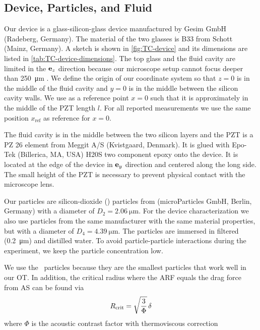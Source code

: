 \subsection{Device, Particles, and Fluid}

Our device is a glass-silicon-glass device manufactured by Gesim GmbH 
(Radeberg, Germany). The material of the two glasses is B33 from Schott (Mainz, 
Germany). A sketch is shown in \cref{fig:TC-device} and its dimensions are listed 
in \cref{tab:TC-device-dimensions}. The top glass and the fluid cavity are limited 
in the $\vb{e}_{z}$ direction because our microscope setup cannot focus deeper than 
\SI{250}{\um} \cite{Lamprecht2016,Lamprecht2017}. We define the origin of our 
coordinate system so that $z = 0$ is in the middle of the fluid cavity and $y = 
0$ is in the middle between the silicon cavity walls. We use as a reference 
point $x = 0$ such that it is approximately in the middle of the PZT length 
$l$. For all reported measurements we use the same position $x_{\text{ref}}$ as 
reference for $x=0$.

The fluid cavity is in the middle between the two silicon layers and the 
PZT is a PZ 26 element from Meggit A/S (Kvistgaard, 
Denmark). It is glued with Epo-Tek (Billerica, MA, USA) H20S two component 
epoxy onto the device. It is located at the edge of the device in $\vb{e}_{y}$ 
direction and centered along the long side. The small height of 
the PZT is necessary to prevent physical contact with the microscope lens.

Our particles are silicon-dioxide (\SiO) particles from (microParticles GmbH, 
Berlin, Germany) with a diameter of $D_{2}=\SI{2.06}{\um}$. For the device 
characterization we also use particles from the same manufacturer with the same 
material properties, but with a diameter of $D_{4} = \SI{4.39}{\um}$. The 
particles are immersed in filtered (\SI{0.2}{\um}) and distilled water. To 
avoid particle-particle interactions during the experiment, we keep the 
particle concentration low.

We use the \Dtwo~particles because they are the smallest particles that work 
well in our OT. In addition, the critical radius where the ARF equals the drag 
force from AS can be found via \cite{Barnkob2012}
\begin{equation}
  R_{\text{crit}} = \sqrt{\frac{3}{\Phi}}\,\delta
\end{equation}
where $\Phi$ is the acoustic contrast factor with thermoviscous correction 
\cite{Settnes2012}




